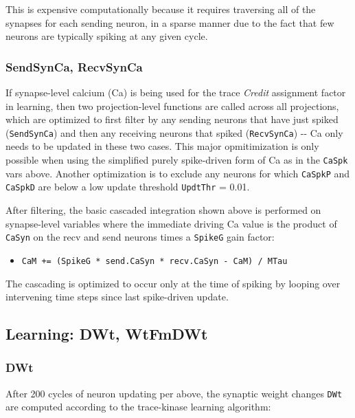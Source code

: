 \documentclass[11pt,twoside]{article}
\newif\myifpdf
\begin{document}
This is expensive computationally because it requires traversing all of
the synapses for each sending neuron, in a sparse manner due to the fact
that few neurons are typically spiking at any given cycle.

\hypertarget{sendsynca-recvsynca}{%
\subsubsection{SendSynCa, RecvSynCa}\label{sendsynca-recvsynca}}

If synapse-level calcium (Ca) is being used for the trace \emph{Credit}
assignment factor in learning, then two projection-level functions are
called across all projections, which are optimized to first filter by
any sending neurons that have just spiked (\texttt{SendSynCa}) and then
any receiving neurons that spiked (\texttt{RecvSynCa}) -\/- Ca only
needs to be updated in these two cases. This major opmitimization is
only possible when using the simplified purely spike-driven form of Ca
as in the \texttt{CaSpk} vars above. Another optimization is to exclude
any neurons for which \texttt{CaSpkP} and \texttt{CaSpkD} are below a
low update threshold \texttt{UpdtThr} = 0.01.

After filtering, the basic cascaded integration shown above is performed
on synapse-level variables where the immediate driving Ca value is the
product of \texttt{CaSyn} on the recv and send neurons times a
\texttt{SpikeG} gain factor:

\begin{itemize}
\tightlist
\item
  \texttt{CaM\ +=\ (SpikeG\ *\ send.CaSyn\ *\ recv.CaSyn\ -\ CaM)\ /\ MTau}
\end{itemize}

The cascading is optimized to occur only at the time of spiking by
looping over intervening time steps since last spike-driven update.

\hypertarget{learning-dwt-wtfmdwt}{%
\subsection{Learning: DWt, WtFmDWt}\label{learning-dwt-wtfmdwt}}

\hypertarget{dwt}{%
\subsubsection{DWt}\label{dwt}}

After 200 cycles of neuron updating per above, the synaptic weight
changes \texttt{DWt} are computed according to the trace-kinase learning
algorithm:
\end{document}
